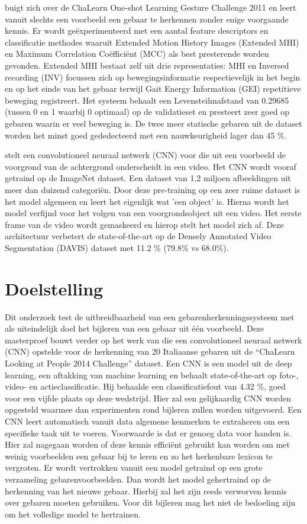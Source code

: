 \npar \cite{oneshot-gesture-rgbd} buigt zich over de ChaLearn One-shot Learning Gesture Challenge 2011 en leert vanuit slechts een voorbeeld een gebaar te herkennen zonder enige voorgaande kennis. Er wordt ge\"experimenteerd met een aantal feature descriptors en classificatie methodes waaruit Extended Motion History Images (Extended MHI) en Maximum Correlation Co\"effici\"ent (MCC) als best presterende worden gevonden. Extended MHI  bestaat zelf uit drie representaties: MHI en Inversed recording (INV) focussen zich op bewegingsinformatie respectievelijk in het begin en op het einde van het gebaar terwijl Gait Energy Information (GEI) repetitieve beweging registreert. Het systeem behaalt een Levensteihnafstand van 0.29685 (tussen 0 en 1 waarbij 0 optimaal) op de validatieset en presteert zeer goed op gebaren waarin er veel beweging is. De twee meer statische gebaren uit de dataset worden het minst goed gededecteerd met een nauwkeurigheid lager dan 45 \%.

\npar \cite{oneshot-video-segm} stelt een convolutioneel neuraal netwerk (CNN) voor die uit een voorbeeld de voorgrond van de achtergrond onderscheidt in een video. Het CNN wordt vooraf getraind op de ImageNet dataset. Een dataset van 1,2 miljoen afbeeldingen uit meer dan duizend categori\"en. Door deze pre-training op een zeer ruime dataset is het model algemeen en leert het eigenlijk wat 'een object' is. Hierna wordt het model verfijnd voor het volgen van een voorgrondsobject uit een video. Het eerste frame van de video wordt gemaskeerd en hierop stelt het model zich af. Deze architectuur verbetert de state-of-the-art op de Densely Annotated Video Segmentation (DAVIS) dataset met 11.2 \% (79.8\% vs 68.0\%).

\section{Doelstelling}
Dit onderzoek test de uitbreidbaarheid van een gebarenherkenningssysteem met als uiteindelijk doel het bijleren van een gebaar uit \'e\'en voorbeeld.
\npar Deze masterproef bouwt verder op het werk van \cite{lionel} die een convolutioneel neuraal netwerk (CNN) opstelde voor de herkenning van 20 Italiaanse gebaren uit de ``ChaLearn Looking at People 2014 Challenge'' dataset. Een CNN is een model uit de deep learning, een aftakking van machine learning en behaalt state-of-the-art op foto-, video- en actieclassificatie.  Hij behaalde een classificatiefout van 4.32 \%, goed voor een vijfde plaats op deze wedstrijd. Hier zal een gelijkaardig CNN worden opgesteld waarmee dan experimenten rond bijleren zullen worden uitgevoerd.
\npar Een CNN leert automatisch vanuit data algemene kenmerken te extraheren om een specifieke taak uit te voeren. Voorwaarde is dat er genoeg data voor handen is. Hier zal nagegaan worden of deze kennis effici\"ent gebruikt kan worden om met weinig voorbeelden een gebaar bij te leren en zo het herkenbare lexicon te vergroten. Er wordt vertrokken vanuit een model getraind op een grote verzameling gebarenvoorbeelden. Dan wordt het model gehertraind op de herkenning van het nieuwe gebaar. Hierbij zal het zijn reeds verworven kennis over gebaren moeten gebruiken. Voor dit bijleren mag het niet de bedoeling zijn om het volledige model te hertrainen.

